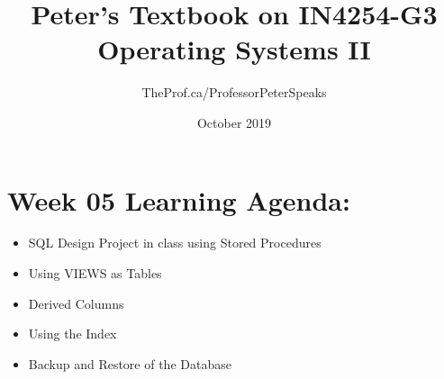\documentclass{article}
\title{Peter's Textbook on IN4254-G3 Operating Systems II}
\author{TheProf.ca/ProfessorPeterSpeaks }
\date{October 2019}
\begin{document}
\maketitle
\tableofcontents

\section{Week 05 Learning Agenda:}

\begin{itemize}
    \item SQL Design Project in class using Stored Procedures
    \item Using VIEWS as Tables 
    \item Derived Columns
    \item Using the Index
    \item Backup and Restore of the Database
\end{itemize}    














\end{document}
